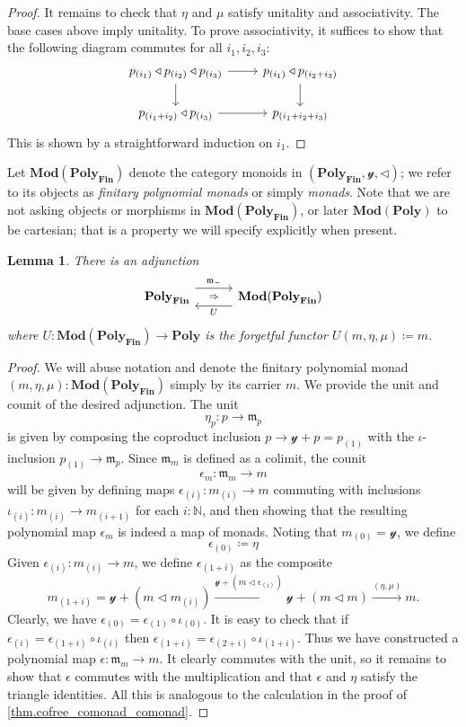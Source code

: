 \documentclass[11pt, one side, article]{memoir}
\newcommand{\adj}[5][30pt]{%
\begin{tikzcd}[ampersand replacement=\&, column sep=#1]
  #2\ar[r, shift left=7pt, "#3"]
  \ar[r, phantom, "\scriptstyle\Rightarrow"]\&
  #5\ar[l, shift left=7pt, "#4"]
\end{tikzcd}
}
\theoremstyle{definition}
\theoremstyle{plain}
\newtheorem{lemma}[definitionx]{Lemma}
\newcommand{\Cat}[1]{\mathbf{#1}}%
\newcommand{\To}[2][]{\xrightarrow[#1]{#2}}
\newcommand{\nn}{\mathbb{N}}
\newcommand{\finset}{\Cat{Fin}}
\newcommand{\polyfin}{\poly_{\finset}}
\newcommand{\Mod}{\Cat{Mod}}
\newcommand{\yon}{\mathcal{y}}
\newcommand{\poly}{\Cat{Poly}}
\newcommand{\tri}{\mathbin{\triangleleft}}
\newcommand{\free}{\mathfrak{m}}
\newcommand{\hoc}[1]{_{(#1)}}
\begin{document}
\begin{proof}
It remains to check that $\eta$ and $\mu$ satisfy unitality and associativity. The base cases above imply unitality. To prove associativity, it suffices to show that the following diagram commutes for all $i_1,i_2,i_3$:
\[
\begin{tikzcd}
	p\hoc{i_1}\tri p\hoc{i_2}\tri p\hoc{i_3}\ar[r]\ar[d]&
	p\hoc{i_1}\tri p\hoc{i_2+i_3}\ar[d]\\
	p\hoc{i_1+i_2}\tri p\hoc{i_3}\ar[r]&
	p\hoc{i_1+i_2+i_3}
\end{tikzcd}
\]
This is shown by a straightforward induction on $i_1$.
\end{proof}

Let $\Mod(\polyfin)$ denote the category monoids in $(\polyfin,\yon,\tri)$; we refer to its objects as \emph{finitary polynomial monads} or simply \emph{monads}. Note that we are not asking objects or morphisms in $\Mod(\polyfin)$, or later $\Mod(\poly)$ to be cartesian; that is a property we will specify explicitly when present.

\begin{lemma}\label{lemma.free_polyfin}
There is an adjunction
\[
\adj{\polyfin}{\free_-}{U}{\Mod(\polyfin)}
\]
where $U\colon\Mod(\polyfin)\to\poly$ is the forgetful functor $U(m,\eta,\mu)\coloneqq m$.
\end{lemma}
\begin{proof}
We will abuse notation and denote the finitary polynomial monad $(m,\eta,\mu):\Mod(\polyfin)$ simply by its carrier $m$. We provide the unit and counit of the desired adjunction. The unit
\[
\eta_p\colon p\to\free_p
\]
is given by composing the coproduct inclusion $p\to\yon+p=p\hoc{1}$ with the $\iota$-inclusion $p\hoc{1}\to\free_{p}$. Since $\free_m$ is defined as a colimit, the counit
\[\epsilon_m\colon\free_m\to m\]
will be given by defining maps $\epsilon\hoc{i}\colon m\hoc{i}\to m$ commuting with inclusions $\iota\hoc{i}\colon m\hoc{i}\to m\hoc{i+1}$ for each $i:\nn$, and then showing that the resulting polynomial map $\epsilon_m$ is indeed a map of monads. Noting that $m\hoc{0}=\yon$, we define
\[
\epsilon\hoc{0}\coloneqq\eta
\]
Given $\epsilon\hoc{i}\colon m\hoc{i}\to m$, we define $\epsilon\hoc{1+i}$ as the composite
\[
	m\hoc{1+i}=
  \yon+\left(m\tri m\hoc{i}\right)\To{\yon+(m\tri\epsilon\hoc{i})}
	\yon+(m\tri m)\To{(\eta,\mu)}
	m.
\]
Clearly, we have $\epsilon\hoc{0}=\epsilon\hoc{1}\circ\iota\hoc{0}$. It is easy to check that if $\epsilon\hoc{i}=\epsilon\hoc{1+i}\circ\iota\hoc{i}$ then $\epsilon\hoc{1+i}=\epsilon\hoc{2+i}\circ\iota\hoc{1+i}$. Thus we have constructed a polynomial map $\epsilon\colon \free_m\to m$. It clearly commutes with the unit, so it remains to show that $\epsilon$ commutes with the multiplication and that $\epsilon$ and $\eta$ satisfy the triangle identities. All this is analogous to the calculation in the proof of \cref{thm.cofree_comonad_comonad}.
\end{proof}
\end{document}
